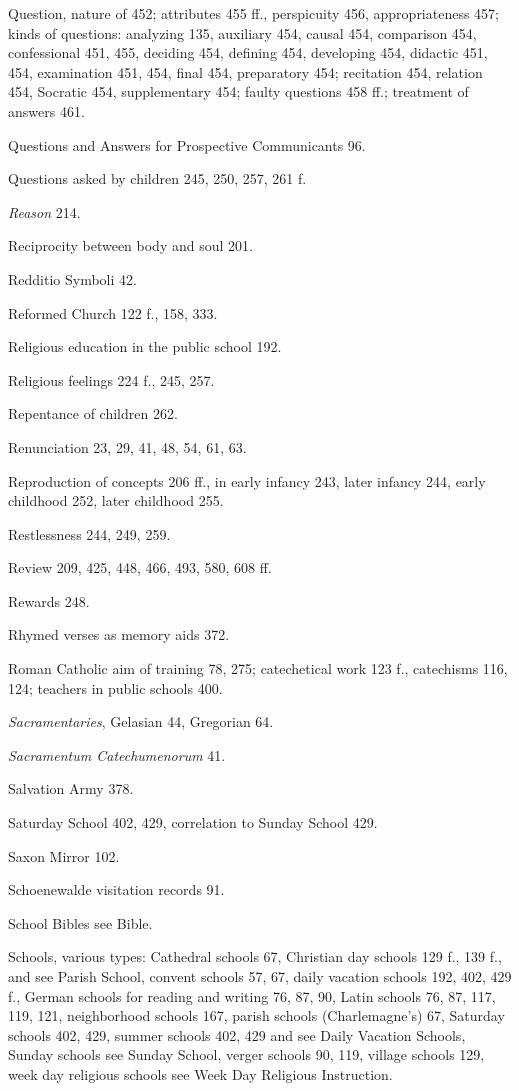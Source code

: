 Question, nature of 452; attributes 455 ff., perspicuity 456, appropriateness 457; kinds of questions: analyzing 135, auxiliary 454, causal 454, comparison 454, confessional 451, 455, deciding 454, defining 454, developing 454, didactic 451, 454, examination 451, 454, final 454, preparatory 454; recitation 454, relation 454, Socratic 454, supplementary 454; faulty questions 458 ff.; treatment of answers 461.

Questions and Answers for Prospective Communicants 96.

Questions asked by children 245, 250, 257, 261 f.

\emph{Reason} 214.

Reciprocity between body and soul 201.

Redditio Symboli 42.

Reformed Church 122 f., 158, 333.

Religious education in the public school 192.

Religious feelings 224 f., 245, 257.

Repentance of children 262.

Renunciation 23, 29, 41, 48, 54, 61, 63.

Reproduction of concepts 206 ff., in early infancy 243, later infancy 244, early childhood 252, later childhood 255.

Restlessness 244, 249, 259.

Review 209, 425, 448, 466, 493, 580, 608 ff.

Rewards 248.

Rhymed verses as memory aids 372.

Roman Catholic aim of training 78, 275; catechetical work 123 f., catechisms 116, 124; teachers in public schools 400.

\emph{Sacramentaries}, Gelasian 44, Gregorian 64.

\emph{Sacramentum Catechumenorum} 41.

Salvation Army 378.

Saturday School 402, 429, correlation to Sunday School 429.

Saxon Mirror 102.

Schoenewalde visitation records 91.

School Bibles see Bible.

Schools, various types: Cathedral schools 67, Christian day schools 129 f., 139 f., and see Parish School, convent schools 57, 67, daily vacation schools 192, 402, 429 f., German schools for reading and writing 76, 87, 90, Latin schools 76, 87, 117, 119, 121, neighborhood schools 167, parish schools (Charlemagne’s) 67, Saturday schools 402, 429, summer schools 402, 429 and see Daily Vacation Schools, Sunday schools see Sunday School, verger schools 90, 119, village schools 129, week day religious schools see Week Day Religious Instruction.

